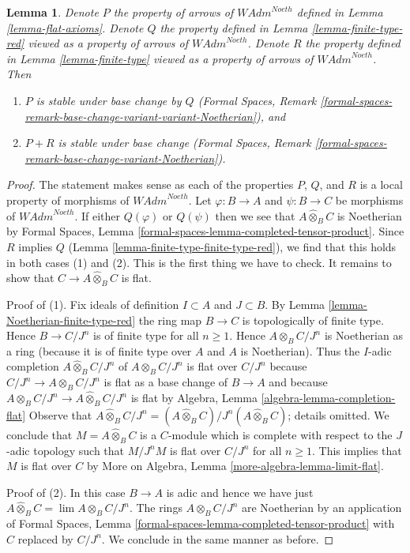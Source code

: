 \documentclass{stacks-project}
\theoremstyle{plain}
\newtheorem{lemma}[subsection]{Lemma}
\theoremstyle{definition}
\theoremstyle{remark}
\numberwithin{equation}{subsection}
\def\lim{\mathop{\mathrm{lim}}\nolimits}
\begin{document}
\begin{lemma}
\label{lemma-base-change-flat-continuous}
Denote $P$ the property of arrows of $\textit{WAdm}^{Noeth}$
defined in Lemma \ref{lemma-flat-axioms}.
Denote $Q$ the property defined in Lemma \ref{lemma-finite-type-red}
viewed as a property of arrows of $\textit{WAdm}^{Noeth}$.
Denote $R$ the property defined in Lemma \ref{lemma-finite-type}
viewed as a property of arrows of $\textit{WAdm}^{Noeth}$. Then
\begin{enumerate}
\item $P$ is stable under base change by $Q$
(Formal Spaces, Remark
\ref{formal-spaces-remark-base-change-variant-variant-Noetherian}), and
\item $P + R$ is stable under base change
(Formal Spaces, Remark
\ref{formal-spaces-remark-base-change-variant-Noetherian}).
\end{enumerate}
\end{lemma}

\begin{proof}
The statement makes sense as each of the properties $P$, $Q$, and $R$
is a local property of morphisms of $\textit{WAdm}^{Noeth}$.
Let $\varphi : B \to A$ and $\psi : B \to C$ be morphisms of
$\textit{WAdm}^{Noeth}$. If either $Q(\varphi)$ or $Q(\psi)$
then we see that $A \widehat{\otimes}_B C$ is Noetherian by
Formal Spaces, Lemma \ref{formal-spaces-lemma-completed-tensor-product}.
Since $R$ implies $Q$ (Lemma \ref{lemma-finite-type-finite-type-red}),
we find that this holds in both cases (1) and (2).
This is the first thing we have to check. It remains to show
that $C \to A \widehat{\otimes}_B C$ is flat.

\medskip\noindent
Proof of (1). Fix ideals of definition $I \subset A$ and $J \subset B$.
By Lemma \ref{lemma-Noetherian-finite-type-red} the ring map
$B \to C$ is topologically of finite type. Hence
$B \to C/J^n$ is of finite type for all $n \geq 1$.
Hence $A \otimes_B C/J^n$ is Noetherian as a ring
(because it is of finite type over $A$ and $A$ is Noetherian).
Thus the $I$-adic completion $A \widehat{\otimes}_B C/J^n$
of $A \otimes_B C/J^n$ is flat over $C/J^n$ because
$C/J^n \to A \otimes_B C/J^n$ is flat as a base change of
$B \to A$ and because
$A \otimes_B C/J^n \to A \widehat{\otimes}_B C/J^n$ is flat by
Algebra, Lemma \ref{algebra-lemma-completion-flat}
Observe that $A \widehat{\otimes}_B C/J^n =
(A \widehat{\otimes}_B C)/J^n(A \widehat{\otimes}_B C)$; details omitted.
We conclude that $M = A \widehat{\otimes}_B C$ is a $C$-module
which is complete with respect to the $J$-adic topology
such that $M/J^nM$ is flat over $C/J^n$ for all $n \geq 1$.
This implies that $M$ is flat over $C$ by
More on Algebra, Lemma \ref{more-algebra-lemma-limit-flat}.

\medskip\noindent
Proof of (2). In this case $B \to A$ is adic and hence we have just
$A \widehat{\otimes}_B C = \lim A \otimes_B C/J^n$.
The rings $A \otimes_B C/J^n$ are Noetherian by an application of 
Formal Spaces, Lemma \ref{formal-spaces-lemma-completed-tensor-product}
with $C$ replaced by $C/J^n$.
We conclude in the same manner as before.
\end{proof}
\end{document}
